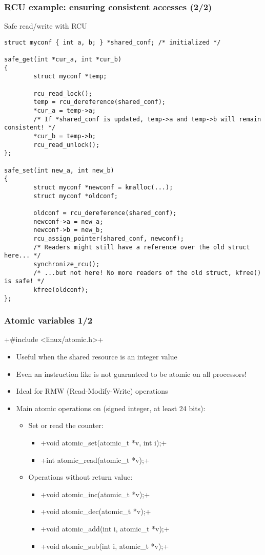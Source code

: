 \begin{frame}[fragile]
  \frametitle{RCU example: ensuring consistent accesses (2/2)}
  \begin{block}{Safe read/write with RCU}
    \begin{verbatim}
struct myconf { int a, b; } *shared_conf; /* initialized */

safe_get(int *cur_a, int *cur_b)
{
        struct myconf *temp;

        rcu_read_lock();
        temp = rcu_dereference(shared_conf);
        *cur_a = temp->a;
        /* If *shared_conf is updated, temp->a and temp->b will remain consistent! */
        *cur_b = temp->b;
        rcu_read_unlock();
};

safe_set(int new_a, int new_b)
{
        struct myconf *newconf = kmalloc(...);
        struct myconf *oldconf;

        oldconf = rcu_dereference(shared_conf);
        newconf->a = new_a;
        newconf->b = new_b;
        rcu_assign_pointer(shared_conf, newconf);
        /* Readers might still have a reference over the old struct here... */
        synchronize_rcu();
        /* ...but not here! No more readers of the old struct, kfree() is safe! */
        kfree(oldconf);
};
    \end{verbatim}
  \end{block}
\end{frame}

\begin{frame}[fragile]
  \frametitle{Atomic variables 1/2}
  +#include <linux/atomic.h>+
  \begin{itemize}
  \item Useful when the shared resource is an integer value
  \item Even an instruction like  is not guaranteed to be
    atomic on all processors!
  \item Ideal for RMW (Read-Modify-Write) operations
  \item Main atomic operations on  (signed integer, at
    least 24 bits):
    \begin{itemize}
    \item Set or read the counter:
      \begin{itemize}
      \item {}+void atomic_set(atomic_t *v, int i);+
      \item {}+int atomic_read(atomic_t *v);+
      \end{itemize}
    \item Operations without return value:
      \begin{itemize}
      \item {}+void atomic_inc(atomic_t *v);+
      \item {}+void atomic_dec(atomic_t *v);+
      \item {}+void atomic_add(int i, atomic_t *v);+
      \item {}+void atomic_sub(int i, atomic_t *v);+
      \end{itemize}
    \end{itemize}
  \end{itemize}
\end{frame}

